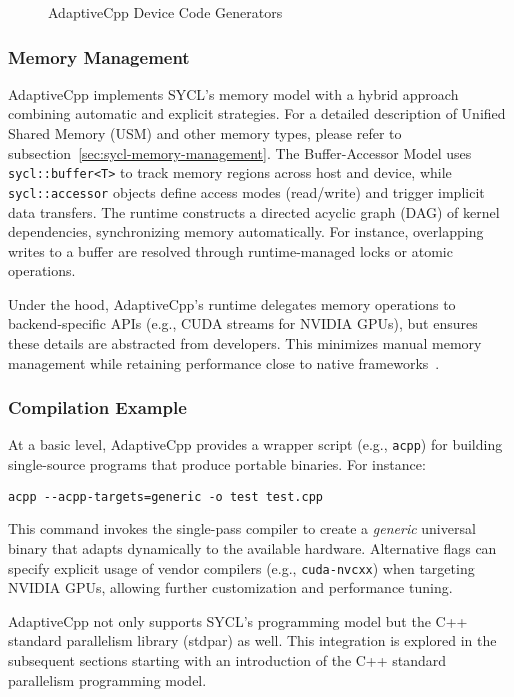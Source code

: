 \begin{figure}[h]
    \centering
    
    \caption{AdaptiveCpp Device Code Generators~\cite{GitAdaptiveCpp}}
    \label{fig:acpp_runtime}
\end{figure}

\subsubsection*{Memory Management}

AdaptiveCpp implements SYCL’s memory model with a hybrid approach combining automatic and explicit strategies.
For a detailed description of Unified Shared Memory (USM) and other memory types, please refer to 
subsection~\ref{sec:sycl-memory-management}. The Buffer-Accessor Model uses \texttt{sycl::buffer<T>} to track memory 
regions across host and device, while \texttt{sycl::accessor} objects define access modes (read/write) and 
trigger implicit data transfers. The runtime constructs a directed acyclic graph (DAG) of kernel dependencies, 
synchronizing memory automatically. For instance, overlapping writes to a buffer are resolved through 
runtime-managed locks or atomic operations.

Under the hood, AdaptiveCpp’s runtime delegates memory operations to backend-specific APIs (e.g., CUDA streams 
for NVIDIA GPUs), but ensures these details are abstracted from developers. This minimizes manual memory 
management while retaining performance close to native frameworks~\cite{SYCL2020}.

\subsubsection*{Compilation Example}

At a basic level, AdaptiveCpp provides a wrapper script (e.g., \texttt{acpp}) for building single-source programs
that produce portable binaries. For instance:

\begin{verbatim}
acpp --acpp-targets=generic -o test test.cpp
\end{verbatim}

This command invokes the single-pass compiler to create a \textit{generic} universal binary that adapts 
dynamically to the available hardware. Alternative flags can specify explicit usage of vendor compilers 
(e.g., \texttt{cuda-nvcxx}) when targeting NVIDIA GPUs, allowing further customization and performance tuning.

AdaptiveCpp not only supports SYCL’s programming model but the C++ standard parallelism library (stdpar) as well.
This integration is explored in the subsequent sections starting with an introduction of the C++ standard parallelism programming model.
